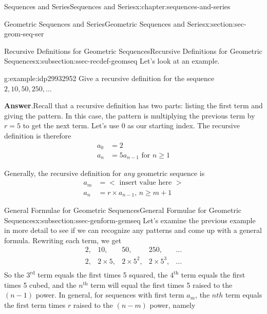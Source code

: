 \documentclass[twoside,10pt,]{book}
\newcommand{\blocktitlefont}{\relax}
\numberwithin{equation}{section}
\newcommand{\nth}{{n^{\text{th}}}}
\newcommand{\upth}[1]{{#1^{\text{th}}}}
\newcommand{\uprd}[1]{{#1^{\text{rd}}}}
\newcommand{\lt}{<}
\newcommand{\gt}{>}
\newcommand{\amp}{&}
\begin{document}
\begin{chapterptx}{Sequences and Series}{}{Sequences and Series}{}{}{x:chapter:sequences-and-series}
\begin{sectionptx}{Geometric Sequences and Series}{}{Geometric Sequences and Series}{}{}{x:section:sec-geom-seq-ser}
\typeout{************************************************}
%
\begin{subsectionptx}{Recursive Definitions for Geometric Sequences}{}{Recursive Definitions for Geometric Sequences}{}{}{x:subsection:ssec-recdef-geomseq}
Let's look at an example. \begin{example}{}{g:example:idp29932952}%
Give a recursive definition for the sequence \(2, 10, 50, 250, \ldots\)\par\smallskip%
\noindent\textbf{\blocktitlefont Answer}.\label{g:answer:idp29939992}{}\hypertarget{g:answer:idp29939992}{}\quad{}Recall that a recursive definition has two parts:  listing the first term and giving the pattern.  In this case, the pattern is multiplying the previous term by \(r = 5\)  to get the next term.  Let's use 0 as our starting index.  The recursive definition is therefore%
\begin{align*}
a_0 \amp = 2\\
a_n \amp = 5a_{n - 1} \text{   for } n \ge 1
\end{align*}
\end{example}
%
\par
Generally, the recursive definition for \emph{any} geometric sequence is%
\begin{align*}
a_m \amp = \lt \text{ insert value here } \gt\\
a_n \amp = r\times a_{n-1},\, n \ge m+1
\end{align*}
%
\end{subsectionptx}
%
%
\typeout{************************************************}
\typeout{************************************************}
%
\begin{subsectionptx}{General Formulae for Geometric Sequences}{}{General Formulae for Geometric Sequences}{}{}{x:subsection:ssec-genform-gemseq}
Let's examine the previous example in more detail to see if we can recognize any patterns and come up with a general formula.  Rewriting each term, we get%
\begin{equation*}
\begin{array}{*{20}{c}}
2,\amp 10,\amp 50,\amp 250,\amp \ldots\\
2,\amp 2 \times 5,\amp 2 \times {5^2},\amp 2 \times {5^3},\amp \ldots\\
\end{array}
\end{equation*}
So the \(\uprd{3}\) term equals the first times 5 squared, the \(\upth{4}\) term equals the first times 5 cubed, and the \(\nth{}\) term will equal the first times 5 raised to the \((n - 1)\) power.  In general, for sequences with first term \(a_m\), the \(nth{}\) term equals the first term times \(r\) raised to the \((n - m)\) power, namely%

\end{subsectionptx}
\end{sectionptx}
\end{chapterptx}
\end{document}
